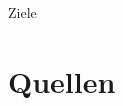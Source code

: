 \documentclass[14pt]{beamer}
\begin{document}
\begin{frame}{Ziele}

\end{frame}

\section{Quellen}

\begin{frame}{}
    \nocite{*}
    

    \twocolumn
    
\end{frame}
\end{document}
